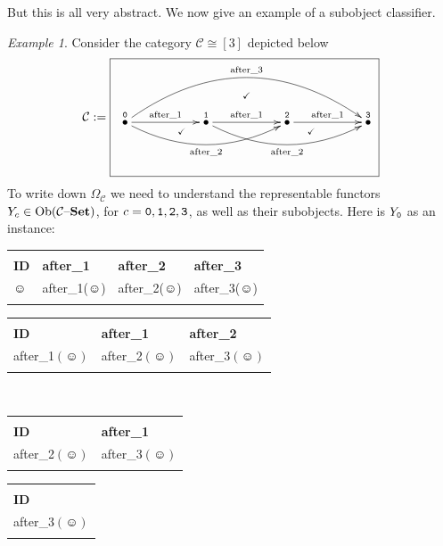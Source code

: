 \documentclass{book}
\def\tn{\textnormal}
\def\mc{\mathcal}
\def\Ob{\tn{Ob}}
\def\hsp{\hspace{.3in}}
\def\iso{\cong}
\newcommand{\LTO}[1]{\stackrel{\tt{#1}}{\bullet}}
\def\set{{\text \textendash}{\bf Set}}
\def\bhline{\Xhline{2\arrayrulewidth}}
\def\bbhline{\Xhline{2.5\arrayrulewidth}}
\def\mcC{\mc{C}}
\theoremstyle{remark}
\newtheorem{example}[subsubsection]{Example}
\theoremstyle{definition}
\begin{document}
But this is all very abstract. We now give an example of a subobject classifier.  

\begin{example}

Consider the category $\mcC\iso[3]$ depicted below
$$\mcC:=\parbox{3in}{\fbox{
\xymatrix{&&&\ar@{}[d]|(.4){\checkmark}&&&\\
\LTO{0}\ar[rr]^{\tn{after\_1}}\ar@/_1.5pc/[rrrr]_{\tn{after\_2}}\ar@/^3pc/[rrrrrr]^{\tn{after\_3}}&&\LTO{1}\ar[rr]^{\tn{after\_1}}\ar@/_1.5pc/[rrrr]_{\tn{after\_2}}&&\LTO{2}\ar[rr]^{\tn{after\_1}}&&\LTO{3}\\
&&&\ar@{}[ull]|(.8){\checkmark}\ar@{}[urr]|(.8){\checkmark}&&
}}}
$$
To write down $\Omega_\mcC$ we need to understand the representable functors $Y_c\in\Ob(\mcC\set)$, for $c={\tt 0},{\tt 1},{\tt 2},{\tt 3}$, as well as their subobjects. Here is $Y_{\tt 0}$ as an instance:

\begin{center}\small
\begin{tabular}{| l || l | l | l |}
\bhline
\multicolumn{4}{|c|}{$Y_{\tt 0}({\tt 0})$}\\\bhline
{\bf ID}&{\bf after\_1}&{\bf after\_2}&{\bf after\_3}\\\bbhline
$\smiley$&after\_1($\smiley$)&after\_2($\smiley$)&after\_3($\smiley$)\\\bhline
\end{tabular}
\hsp
\begin{tabular}{| l || l | l |}
\bhline
\multicolumn{3}{|c|}{$Y_{\tt 0}({\tt 1})$}\\\bhline
{\bf ID}&{\bf after\_1}&{\bf after\_2}\\\bbhline
after\_1$(\smiley)$&after\_2$(\smiley)$&after\_3$(\smiley)$\\\bhline
\end{tabular}\\\vspace{.2in}
\begin{tabular}{| l || l |}
\bhline
\multicolumn{2}{|c|}{$Y_{\tt 0}({\tt 2})$}\\\bhline
{\bf ID}&{\bf after\_1}\\\bbhline
after\_2$(\smiley)$&after\_3$(\smiley)$\\\bhline
\end{tabular}
\hsp
\begin{tabular}{| l ||}
\bhline
\multicolumn{1}{|c|}{$Y_{\tt 0}({\tt 3})$}\\\bhline
{\bf ID}\\\bbhline
after\_3$(\smiley)$\\\bhline
\end{tabular}


\end{center}
\end{example}
\end{document}
